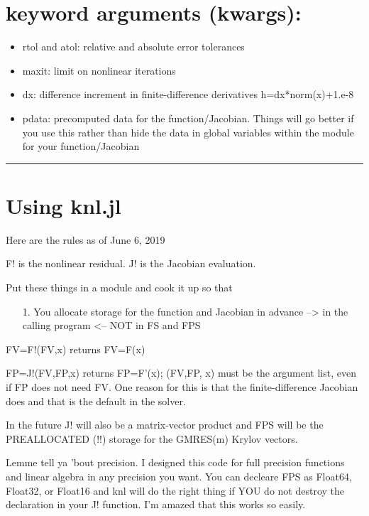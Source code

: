 \documentclass[11pt]{article}
\begin{document}
\section{keyword arguments (kwargs):}
\begin{itemize}
\item rtol and atol: relative and absolute error tolerances


\item maxit: limit on nonlinear iterations


\item dx: difference increment in finite-difference derivatives     h=dx*norm(x)+1.e-8


\item pdata: precomputed data for the function/Jacobian.       Things will go better if you use this rather than hide the data       in global variables within the module for your function/Jacobian

\end{itemize}
\rule{\textwidth}{1pt}
\section{Using knl.jl}
Here are the rules as of June 6, 2019

F! is the nonlinear residual.  J! is the Jacobian evaluation.

Put these things in a module and cook it up so that

\begin{itemize}
\item[1. ] You allocate storage for the function and Jacobian in advance  –> in the calling program <– NOT in FS and FPS

\end{itemize}
FV=F!(FV,x) returns FV=F(x)

FP=J!(FV,FP,x) returns FP=F'(x);      (FV,FP, x) must be the argument list, even if FP does not need FV.     One reason for this is that the finite-difference Jacobian     does and that is the default in the solver.

In the future J! will also be a matrix-vector product and FPS will be the PREALLOCATED (!!) storage for the GMRES(m) Krylov vectors.

Lemme tell ya 'bout precision. I designed this code for full precision functions and linear algebra in any precision you want. You can decleare FPS as Float64, Float32, or Float16 and knl will do the right thing if  YOU do not destroy the declaration in your J! function. I'm amazed  that this works so easily. 
\end{document}
